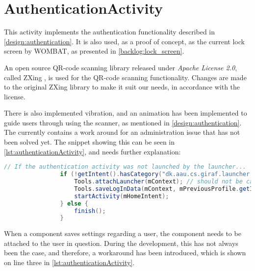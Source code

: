 \section{AuthenticationActivity}

This activity implements the authentication functionality described in \autoref{design:authentication}. 
It is also used, as a proof of concept, as the current lock screen by WOMBAT, as presented in \autoref{backlog:lock_screen}.

An open source QR-code scanning library released under \emph{Apache License 2.0}, called ZXing \citep{web:ZXing}, is used for the QR-code scanning functionality.
Changes are made to the original ZXing library to make it suit our needs, in accordance with the license.

There is also implemented vibration, and an animation has been implemented to guide users through using the scanner, as mentioned in \autoref{design:authentication}.\\

The  currently contains a work around for an administration issue that has not been solved yet.
The snippet showing this can be seen in \autoref{lst:authenticationActivity}, and needs further explanation:

\begin{lstlisting}[style=sourceCode, language=JAVA, caption=Code snippet from the AuthenticationActivity, label=lst:authenticationActivity] 
				// If the authentication activity was not launched by the launcher...
				if (!getIntent().hasCategory("dk.aau.cs.giraf.launcher.GIRAF")) {
					Tools.attachLauncher(mContext); // should not be called
					Tools.saveLogInData(mContext, mPreviousProfile.getId());
					startActivity(mHomeIntent);
				} else {
					finish();
				}
\end{lstlisting}

When a \giraf[] component saves settings regarding a user, the component needs to be attached to the user in question.
During the development, this has not always been the case, and therefore, a workaround has been introduced, which is shown on line three in \autoref{lst:authenticationActivity}.